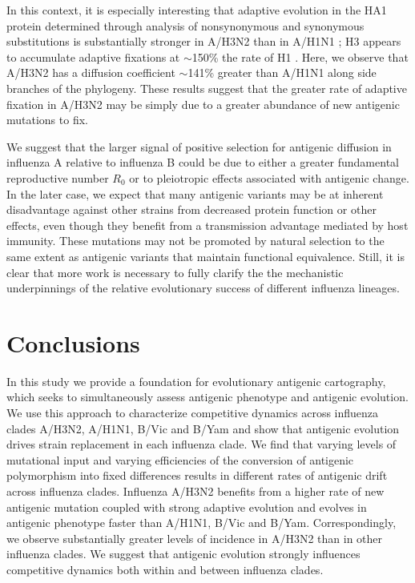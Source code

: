 \documentclass[11pt,oneside,letterpaper]{article}
\begin{document}
In this context, it is especially interesting that adaptive evolution in the HA1 protein determined through analysis of nonsynonymous and synonymous substitutions is substantially stronger in A/H3N2 than in A/H1N1 \cite{Wolf06}; H3 appears to accumulate adaptive fixations at $\sim$150\% the rate of H1 \cite{Bhatt11}.
Here, we observe that A/H3N2 has a diffusion coefficient $\sim$141\% greater than A/H1N1 along side branches of the phylogeny.
These results suggest that the greater rate of adaptive fixation in A/H3N2 may be simply due to a greater abundance of new antigenic mutations to fix.

We suggest that the larger signal of positive selection for antigenic diffusion in influenza A relative to influenza B could be due to either a greater fundamental reproductive number $R_0$ or to pleiotropic effects associated with antigenic change.
In the later case, we expect that many antigenic variants may be at inherent disadvantage against other strains from decreased protein function \cite{Kaverin04,Rudneva12} or other effects, even though they benefit from a transmission advantage mediated by host immunity.
These mutations may not be promoted by natural selection to the same extent as antigenic variants that maintain functional equivalence.
Still, it is clear that more work is necessary to fully clarify the the mechanistic underpinnings of the relative evolutionary success of different influenza lineages.

\section*{Conclusions}

In this study we provide a foundation for evolutionary antigenic cartography, which seeks to simultaneously assess antigenic phenotype and antigenic evolution.
We use this approach to characterize competitive dynamics across influenza clades A/H3N2, A/H1N1, B/Vic and B/Yam and show that antigenic evolution drives strain replacement in each influenza clade.
We find that varying levels of mutational input and varying efficiencies of the conversion of antigenic polymorphism into fixed differences results in different rates of antigenic drift across influenza clades.
Influenza A/H3N2 benefits from a higher rate of new antigenic mutation coupled with strong adaptive evolution and evolves in antigenic phenotype faster than A/H1N1, B/Vic and B/Yam.
Correspondingly, we observe substantially greater levels of incidence in A/H3N2 than in other influenza clades.
We suggest that antigenic evolution strongly influences competitive dynamics both within and between influenza clades.
\end{document}
